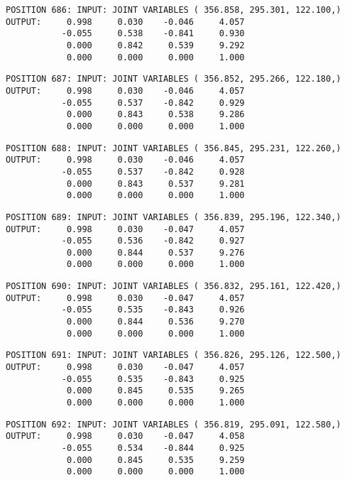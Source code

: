 \begin{verbatim}
POSITION 686: INPUT: JOINT VARIABLES ( 356.858, 295.301, 122.100,)
OUTPUT:     0.998     0.030    -0.046     4.057
           -0.055     0.538    -0.841     0.930
            0.000     0.842     0.539     9.292
            0.000     0.000     0.000     1.000
\end{verbatim} \pagebreak[1]\begin{verbatim}
POSITION 687: INPUT: JOINT VARIABLES ( 356.852, 295.266, 122.180,)
OUTPUT:     0.998     0.030    -0.046     4.057
           -0.055     0.537    -0.842     0.929
            0.000     0.843     0.538     9.286
            0.000     0.000     0.000     1.000
\end{verbatim} \pagebreak[1]\begin{verbatim}
POSITION 688: INPUT: JOINT VARIABLES ( 356.845, 295.231, 122.260,)
OUTPUT:     0.998     0.030    -0.046     4.057
           -0.055     0.537    -0.842     0.928
            0.000     0.843     0.537     9.281
            0.000     0.000     0.000     1.000
\end{verbatim} \pagebreak[1]\begin{verbatim}
POSITION 689: INPUT: JOINT VARIABLES ( 356.839, 295.196, 122.340,)
OUTPUT:     0.998     0.030    -0.047     4.057
           -0.055     0.536    -0.842     0.927
            0.000     0.844     0.537     9.276
            0.000     0.000     0.000     1.000
\end{verbatim} \pagebreak[1]\begin{verbatim}
POSITION 690: INPUT: JOINT VARIABLES ( 356.832, 295.161, 122.420,)
OUTPUT:     0.998     0.030    -0.047     4.057
           -0.055     0.535    -0.843     0.926
            0.000     0.844     0.536     9.270
            0.000     0.000     0.000     1.000
\end{verbatim} \pagebreak[1]\begin{verbatim}
POSITION 691: INPUT: JOINT VARIABLES ( 356.826, 295.126, 122.500,)
OUTPUT:     0.998     0.030    -0.047     4.057
           -0.055     0.535    -0.843     0.925
            0.000     0.845     0.535     9.265
            0.000     0.000     0.000     1.000
\end{verbatim} \pagebreak[1]\begin{verbatim}
POSITION 692: INPUT: JOINT VARIABLES ( 356.819, 295.091, 122.580,)
OUTPUT:     0.998     0.030    -0.047     4.058
           -0.055     0.534    -0.844     0.925
            0.000     0.845     0.535     9.259
            0.000     0.000     0.000     1.000
\end{verbatim} \pagebreak[1]\begin{verbatim}

\end{verbatim}
